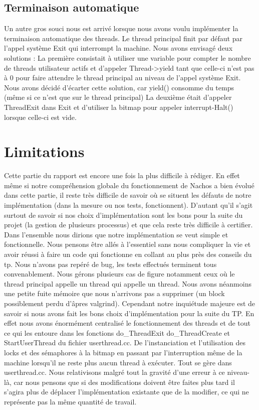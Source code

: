 \documentclass[10pt]{article}
\begin{document}
\subsection{Terminaison automatique}
Un autre gros souci nous est arrivé lorsque nous avons voulu implémenter la terminaison
automatique des threads. Le thread principal finit par défaut par l'appel système \textcolor{blue2}{Exit}
qui interrompt la machine.
Nous avons envisagé deux solutions :
La première consistait à utiliser une variable pour compter le nombre de threads utilisateur actifs
et d'appeler \textcolor{red2}{Thread->yield} tant que celle-ci n'est pas à 0 pour faire attendre le thread principal
au niveau de l'appel système \textcolor{blue2}{Exit}. Nous avons décidé d'écarter cette solution, car yield()
consomme du temps (même si ce n'est que sur le thread principal)
La deuxième était d'appeler \textcolor{blue2}{ThreadExit} dans \textcolor{blue2}{Exit} et d'utiliser la bitmap pour appeler interrupt-Halt()
lorsque celle-ci est vide.


\section{Limitations}

Cette partie du rapport est encore une fois la plus difficile à rédiger. En effet
même si notre compréhension globale du fonctionnement de Nachos a bien évolué dans
cette partie, il reste très difficile de savoir où se situent les défauts de notre
implémentation (dans la mesure ou nos tests, fonctionnent). D'autant qu'il s'agit surtout
de savoir si nos choix d'implémentation sont les bons pour la suite du projet (la gestion
de plusieurs processus) et que cela reste très difficile à certifier.
\newline
Dans l'ensemble nous dirions que notre implémentation se veut simple et fonctionnelle.
Nous pensons être allés à l'essentiel sans nous compliquer la vie et avoir réussi à faire
un code qui fonctionne en collant au plus près des conseils du tp.
Nous n'avons pas repéré de bug, les tests effectués terminent tous convenablement. Nous gérons plusieurs
cas de figure notamment ceux où le thread principal appelle un thread qui appelle un thread.
\newpage
Nous avons néanmoins une petite fuite mémoire que nous n'arrivons pas a
supprimer (un block possiblement perdu d'âpres valgrind).
Cependant notre inquiétude majeure est de savoir si nous avons fait les bons choix d'implémentation
pour la suite du TP. En effet nous avons énormément centralisé le fonctionnement des
threads et de tout ce qui les entoure dans les fonctions \textcolor{red2}{do\_ThreadExit}
\textcolor{red2}{do\_ThreadCreate} et \textcolor{red2}{StartUserThread} du fichier \textcolor{vert2}{userthread.cc}.
De l'instanciation et l'utilisation des locks et des sémaphores à la bitmap en passant par
l'interruption même de la machine lorsqu'il ne reste plus aucun thread à exécuter. Tout
se gère dans \textcolor{vert2}{userthread.cc}.
\newline
Nous relativisons malgré tout la gravité d'une erreur à ce niveau-là, car nous pensons que si
des modifications doivent être faites plus tard il s'agira plus de déplacer l'implémentation existante que de
la modifier, ce qui ne représente pas la même quantité de travail.
\end{document}
